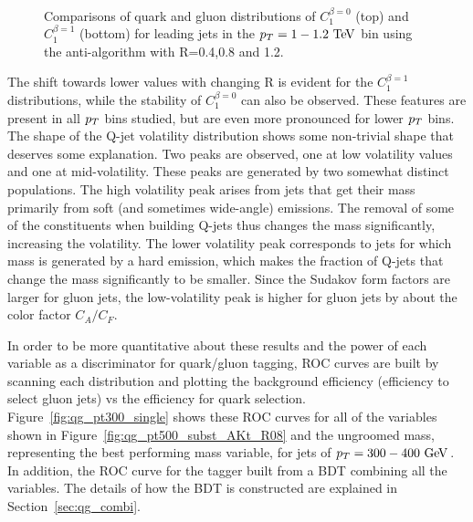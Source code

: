 \begin{figure}
\begin{center}
\\
\caption{Comparisons of quark and gluon distributions of $C_1^{\beta=0}$ (top) and $C_1^{\beta=1}$ (bottom) 
for leading jets in the $\pt=1-1.2 \TeV$ bin using the anti-\kT algorithm with R=0.4,0.8 and 1.2. }
\label{fig:Rdep_qg_C_pt1000}
\end{center}
\end{figure}
The shift towards lower values with changing R is evident for the $C_1^{\beta=1}$ distributions, while the stability
of $C_1^{\beta=0}$ can also be observed. These features are present in all $p_T$ bins studied, but are even more
pronounced for lower $p_T$ bins. The shape of the Q-jet volatility distribution shows some non-trivial shape that
deserves some explanation. Two peaks are observed, one at low volatility values and one at mid-volatility. These
peaks are generated by two somewhat distinct populations. The high volatility peak arises from jets that get their
mass primarily from soft (and sometimes wide-angle) emissions. The removal of some of the constituents when
building Q-jets thus changes the mass significantly, increasing the volatility. The lower volatility peak corresponds
to jets for which mass is generated by a hard emission, which makes the fraction of Q-jets that change 
the mass significantly to be smaller. Since the Sudakov form factors are larger for gluon jets, the low-volatility 
peak is higher for gluon jets by about the color factor $C_A/C_F$. 

In order to be more quantitative about these results and the power of each variable as a
discriminator for quark/gluon tagging, ROC curves are built by scanning each distribution
and plotting the background efficiency (efficiency to select gluon jets) vs the efficiency for
quark selection. 
Figure~\ref{fig:qg_pt300_single} shows these ROC curves for all of the variables shown in 
Figure~\ref{fig:qg_pt500_subst_AKt_R08} and the ungroomed mass, representing the 
best performing mass variable, for jets of $\pt=300-400\GeV$. In addition, the ROC curve for 
the tagger built from a BDT combining all the variables. The details of how the BDT is constructed 
are explained in Section~\ref{sec:qg_combi}. 

